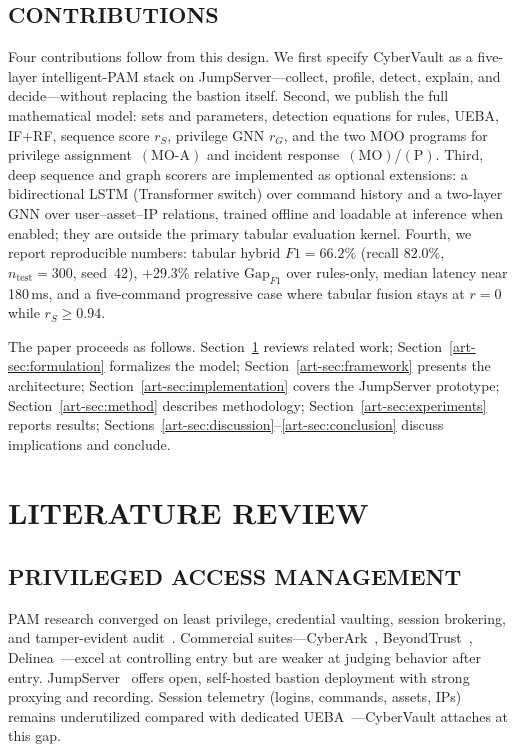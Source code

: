 \subsection{CONTRIBUTIONS}
Four contributions follow from this design.
We first specify CyberVault as a five-layer intelligent-PAM stack on JumpServer---collect, profile, detect, explain, and decide---without replacing the bastion itself.
Second, we publish the full mathematical model: sets and parameters, detection equations for rules, UEBA, IF+RF, sequence score $r_S$, privilege GNN $r_G$, and the two MOO programs for privilege assignment~$(\mathrm{MO}\text{-}\mathrm{A})$ and incident response~$(\mathrm{MO})$/$(\mathrm{P})$.
Third, deep sequence and graph scorers are implemented as optional extensions: a bidirectional LSTM (Transformer switch) over command history and a two-layer GNN over user--asset--IP relations, trained offline and loadable at inference when enabled; they are outside the primary tabular evaluation kernel.
Fourth, we report reproducible numbers: tabular hybrid $F1=66.2\%$ (recall $82.0\%$, $n_{\mathrm{test}}=300$, seed~42), +29.3\% relative $\mathrm{Gap}_{F1}$ over rules-only, median latency near 180\,ms, and a five-command progressive case where tabular fusion stays at $r{=}0$ while $r_S\geq 0.94$.

The paper proceeds as follows. Section~\ref{art-sec:related} reviews related work; Section~\ref{art-sec:formulation} formalizes the model; Section~\ref{art-sec:framework} presents the architecture; Section~\ref{art-sec:implementation} covers the JumpServer prototype; Section~\ref{art-sec:method} describes methodology; Section~\ref{art-sec:experiments} reports results; Sections~\ref{art-sec:discussion}--\ref{art-sec:conclusion} discuss implications and conclude.

\section{LITERATURE REVIEW}
\label{art-sec:related}

\subsection{PRIVILEGED ACCESS MANAGEMENT}
PAM research converged on least privilege, credential vaulting, session brokering, and tamper-evident audit~\cite{ref1,ref2,ref4,ref26}. Commercial suites---CyberArk~\cite{ref16}, BeyondTrust~\cite{ref17}, Delinea~\cite{ref18}---excel at controlling entry but are weaker at judging behavior after entry. JumpServer~\cite{ref5} offers open, self-hosted bastion deployment with strong proxying and recording. Session telemetry (logins, commands, assets, IPs) remains underutilized compared with dedicated UEBA~\cite{ref27}---CyberVault attaches at this gap.

